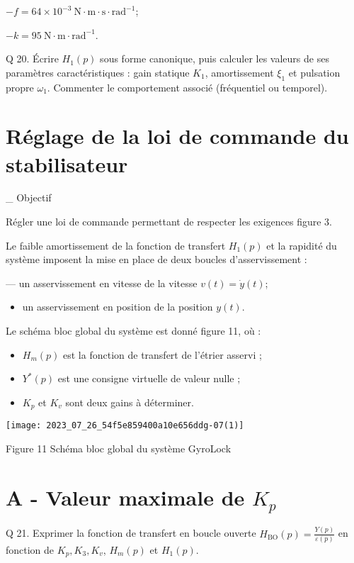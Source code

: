 $-f=64 \times 10^{-3} \mathrm{~N} \cdot \mathrm{m} \cdot \mathrm{s} \cdot \mathrm{rad}^{-1}$;

$-k=95 \mathrm{~N} \cdot \mathrm{m} \cdot \mathrm{rad}^{-1}$.

Q 20. Écrire $H_{1}(p)$ sous forme canonique, puis calculer les valeurs de ses paramètres caractéristiques : gain statique $K_{1}$, amortissement $\xi_{1}$ et pulsation propre $\omega_{1}$. Commenter le comportement associé (fréquentiel ou temporel).

\section{Réglage de la loi de commande du stabilisateur}
\_ Objectif

Régler une loi de commande permettant de respecter les exigences figure 3.

Le faible amortissement de la fonction de transfert $H_{1}(p)$ et la rapidité du système imposent la mise en place de deux boucles d'asservissement :

— un asservissement en vitesse de la vitesse $v(t)=\dot{y}(t)$;

\begin{itemize}
  \item un asservissement en position de la position $y(t)$.
\end{itemize}

Le schéma bloc global du système est donné figure 11, où :

\begin{itemize}
  \item $H_{m}(p)$ est la fonction de transfert de l'étrier asservi ;

  \item $Y^{*}(p)$ est une consigne virtuelle de valeur nulle ;

  \item $K_{p}$ et $K_{v}$ sont deux gains à déterminer.

\end{itemize}

\begin{center}
\texttt{[image: 2023\_07\_26\_54f5e859400a10e656ddg-07(1)]}
\end{center}

Figure 11 Schéma bloc global du système GyroLock

\section{A - Valeur maximale de $K_{p}$}
Q 21. Exprimer la fonction de transfert en boucle ouverte $H_{\mathrm{BO}}(p)=\frac{Y(p)}{\varepsilon(p)}$ en fonction de $K_{p}, K_{3}, K_{v}$, $H_{m}(p)$ et $H_{1}(p)$.

